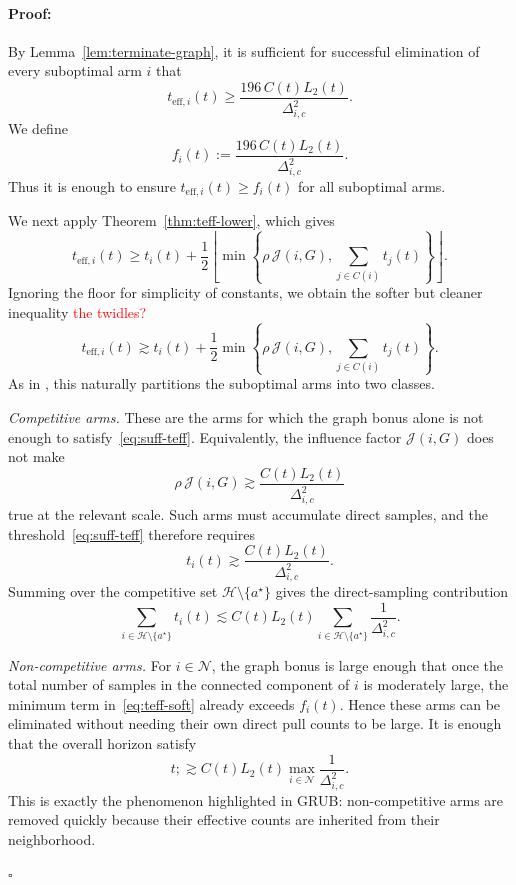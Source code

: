 \documentclass{article}
\newenvironment{proof}{\paragraph{Proof:}}{\hfill$\square$}
\begin{document}
\begin{proof}
By Lemma~\ref{lem:terminate-graph}, it is sufficient for successful elimination of every suboptimal arm $i$ that
\begin{equation}
\label{eq:suff-teff}
t_{\mathrm{eff},i}(t)
\ge
\frac{196\,C(t)L_2(t)}{\Delta_{i,c}^2}.
\end{equation}
We define
\[
f_i(t):=\frac{196\,C(t)L_2(t)}{\Delta_{i,c}^2}.
\]
Thus it is enough to ensure $t_{\mathrm{eff},i}(t)\ge f_i(t)$ for all suboptimal arms.

We next apply Theorem~\ref{thm:teff-lower}, which gives
\[
t_{\mathrm{eff},i}(t)
\ge
 t_i(t)+\frac12\left\lfloor \min\!\left\{\rho\,\mathcal J(i,G),\sum_{j\in C(i)} t_j(t)\right\}\right\rfloor.
\]
Ignoring the floor for simplicity of constants, we obtain the softer but cleaner inequality \textcolor{red}{the twidles?}
\begin{equation}
\label{eq:teff-soft}
t_{\mathrm{eff},i}(t)
\gtrsim
 t_i(t)+\frac12\min\!\left\{\rho\,\mathcal J(i,G),\sum_{j\in C(i)} t_j(t)\right\}.
\end{equation}
As in \citet{thaker2022maximizing}, this naturally partitions the suboptimal arms into two classes.

\smallskip
\noindent
\emph{Competitive arms.}
These are the arms for which the graph bonus alone is not enough to satisfy~\eqref{eq:suff-teff}. Equivalently, the influence factor $\mathcal J(i,G)$ does not make
\[
\rho\,\mathcal J(i,G)
\gtrsim
\frac{C(t)L_2(t)}{\Delta_{i,c}^2}
\]
true at the relevant scale. Such arms must accumulate direct samples, and the threshold~\eqref{eq:suff-teff} therefore requires
\[
t_i(t)
\gtrsim
\frac{C(t)L_2(t)}{\Delta_{i,c}^2}.
\]
Summing over the competitive set $\mathcal H\setminus\{a^\star\}$ gives the direct-sampling contribution
\begin{equation}
\label{eq:comp-contrib}
\sum_{i\in\mathcal H\setminus\{a^\star\}} t_i(t)
\lesssim
C(t)L_2(t)
\sum_{i\in\mathcal H\setminus\{a^\star\}}\frac{1}{\Delta_{i,c}^2}.
\end{equation}

\smallskip
\noindent
\emph{Non-competitive arms.}
For $i\in\mathcal N$, the graph bonus is large enough that once the total number of samples in the connected component of $i$ is moderately large, the minimum term in~\eqref{eq:teff-soft} already exceeds $f_i(t)$. Hence these arms can be eliminated without needing their own direct pull counts to be large. It is enough that the overall horizon satisfy
\[
t
;
\gtrsim
C(t)L_2(t)
\max_{i\in\mathcal N}\frac{1}{\Delta_{i,c}^2}.
\]
This is exactly the phenomenon highlighted in GRUB: non-competitive arms are removed quickly because their effective counts are inherited from their neighborhood.


\end{proof}
\end{document}
